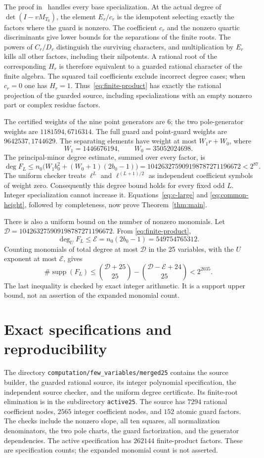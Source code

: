 \documentclass[11pt,a4paper]{article}
\begin{document}
The proof in~\cite{Active} handles every base specialization.
At the actual degree of $\det(I-vM_{T_0})$, the element $E_r/c_r$
is the idempotent selecting exactly the factors where the guard is
nonzero. The coefficient $c_r$ and the nonzero quartic discriminants
give lower bounds for the separations of the finite roots. The
powers of $C_r/D_r$ distinguish the surviving characters, and
multiplication by $E_r$ kills all other factors, including their
nilpotents. A rational root of the corresponding $H_r$ is therefore
equivalent to a guarded rational character of the finite algebra.
The squared tail coefficients exclude incorrect degree cases; when
$c_r=0$ one has $H_r=1$. Thus~\eqref{eq:finite-product} has
exactly the rational projection of the guarded source, including
specializations with an empty nonzero part or complex residue factors.

The certified weights of the nine point generators are $6$; the
two pole-generator weights are $1181594,6716314$. The full
guard and point-guard weights are $9642537,1744629$.
The separating elements have weight at most $W_1r+W_0$, where
\[
 W_1=1446676194,\qquad W_0=35052024698.
\]
The principal-minor degree estimate, summed over every factor, is
\[
 \deg F_L\le n_0\bigl(W_1b_0^2+(W_0+1)(2b_0-1)\bigr)
       =104263275909198787271196672<2^{87}.
\]
The uniform checker treats $\ell^L$ and $\ell^{(L+1)/2}$ as
independent coefficient symbols of weight zero. Consequently this
degree bound holds for every fixed odd $L$. Integer specialization
cannot increase it. Equations~\eqref{eq:c-large} and
\eqref{eq:common-height}, followed by completeness, now prove
Theorem~\ref{thm:main}.

There is also a uniform bound on the number of nonzero monomials.
Let $\mathcal D=104263275909198787271196672$. From
\eqref{eq:finite-product},
\[
 \deg_U F_L\le\mathcal E=n_0(2b_0-1)=549754765312.
\]
Counting monomials of total degree at most $\mathcal D$ in the
25 variables, with the $U$ exponent at most $\mathcal E$, gives
\[
 \#\operatorname{supp}(F_L)
 \le\binom{\mathcal D+25}{25}
      -\binom{\mathcal D-\mathcal E+24}{25}<2^{2035}.
\]
The last inequality is checked by exact integer arithmetic. It is a
support upper bound, not an assertion of the expanded monomial count.

\section{Exact specifications and reproducibility}

The directory \nolinkurl{computation/few_variables/merged25} contains
the source builder, the guarded rational source, its integer polynomial
specification, the independent source checker, and the uniform degree
certificate. Its finite-root elimination is in the subdirectory
\nolinkurl{active25}. The source has $7294$ rational
coefficient nodes, $2565$ integer coefficient nodes, and $152$
atomic guard factors. The checks include the nonzero slope, all ten
squares, all normalization denominators, the two pole charts,
the guard factorization, and the generator dependencies. The active
specification has $262144$ finite-product factors. These are
specification counts; the expanded monomial count is not asserted.
\end{document}
